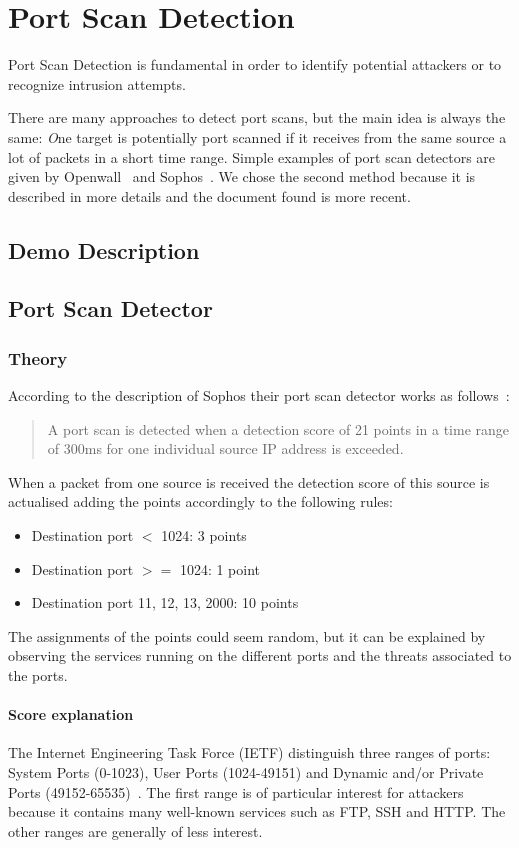 \chapter{Port Scan Detection}
\label{sec:detector}
Port Scan Detection is fundamental in order
to identify potential attackers or to recognize intrusion attempts.

There are many approaches to detect port scans, but the main idea
is always the same: \textit{O}ne target is potentially port scanned if it receives
from the same source a lot of packets in a short time range.
Simple examples of port scan detectors are given by 
Openwall~\cite{scanlogd} and Sophos~\cite{sophos}.
We chose the second method because it is described in more details and the document found
is more recent.



\section{Demo Description}

\section{Port Scan Detector}


\subsection{Theory}
According to the description of Sophos their port scan detector works as follows~\cite{sophos}:
\begin{quote}
	A port scan is detected when a detection score of 21 points
	in a time range of 300ms for one individual source IP address is exceeded.
\end{quote}
When a packet from one source is received the detection score of this source
is actualised adding the points accordingly to the following rules:
\begin{itemize}
	\item Destination port $<$ 1024: 3 points
	\item Destination port $>=$ 1024: 1 point
	\item Destination port 11, 12, 13, 2000: 10 points
\end{itemize}
The assignments of the points could seem random, but it can be explained by observing the services running on the different ports and the threats associated to the ports.
\subsubsection{Score explanation}
The Internet Engineering Task Force (IETF) distinguish three ranges of ports: System Ports (0-1023), 
User Ports (1024-49151) and Dynamic and/or Private Ports (49152-65535)~\cite{rfc6335}.
The first range is of particular interest for attackers because it contains many well-known services such as FTP, SSH and HTTP.
The other ranges are generally of less interest.

